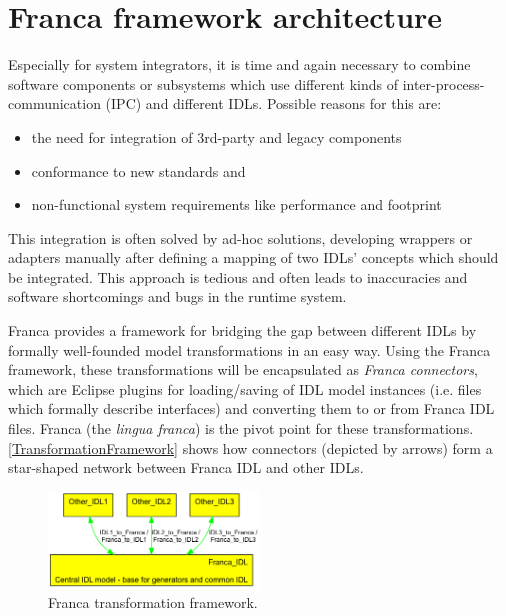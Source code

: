 \documentclass[a4paper,10pt]{scrreprt}
\newlength{\XdocItemIndent}
\begin{document}
\section{Franca framework architecture}
\label{Intro_FrancaArchitecture}
Especially for system integrators, it is time and again necessary to combine
software components or subsystems which use different kinds of 
inter-process-communication (IPC) and different IDLs. Possible reasons for this
are:
\setlength{\XdocItemIndent}{\textwidth}
\begin{itemize}
\addtolength{\XdocItemIndent}{-2.5em}
\item \begin{minipage}[t]{\XdocItemIndent}
the need for integration of 3rd-party and legacy components

\end{minipage}
\item \begin{minipage}[t]{\XdocItemIndent}
conformance to new standards and

\end{minipage}
\item \begin{minipage}[t]{\XdocItemIndent}
non-functional system requirements like performance and footprint

\end{minipage}
\end{itemize}
\addtolength{\XdocItemIndent}{2.5em}

This integration is often solved by ad-hoc solutions, developing wrappers 
or adapters manually after defining a mapping of two IDLs' concepts which
should be integrated. This approach is tedious and often leads to inaccuracies 
and software shortcomings and bugs in the runtime system.

Franca provides a framework for bridging the gap between different
IDLs by formally well-founded model transformations in an easy way.
Using the Franca framework, these transformations will be encapsulated
as \textit{Franca connectors}, which are Eclipse plugins for loading/saving of
IDL model instances (i.e. files which formally describe interfaces) and
converting them to or from Franca IDL files. Franca (the \textit{lingua franca})
is the pivot point for these transformations.
\autoref{TransformationFramework} shows how connectors (depicted by arrows)
form a star-shaped network between Franca IDL and other IDLs. 

\begin{figure}[!ht]
\centering
\includegraphics[width=0.50\textwidth]{images-gen/franca_trafos_conceptual_hts_logical.png}
\caption{Franca transformation framework.}
\label{TransformationFramework}
\end{figure}
\end{document}
